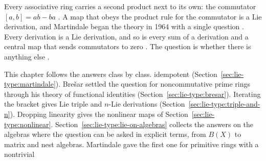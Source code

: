 Every associative ring carries a second product next to its own: the commutator
$[a,b]=ab-ba$ \cite[p.~183]{Martindale1964}. A map that obeys the product rule
for the commutator is a Lie derivation, and Martindale began the theory in 1964
with a single question \cite[p.~183]{Martindale1964}. Every derivation is a Lie derivation, and so is
every sum of a derivation and a central map that sends commutators to zero
\cite[p.~183]{Martindale1964}. The question is whether there is anything else
\cite[p.~183]{Martindale1964}.

This chapter follows the answers class by class.
idempotent (Section~\ref{sec:lie-type:martindale}). Brešar settled the
question for noncommutative prime rings through his theory of functional
identities (Section~\ref{sec:lie-type:bresar}). Iterating the bracket gives
Lie triple and $n$-Lie derivations (Section~\ref{sec:lie-type:triple-and-n}).
Dropping linearity gives the nonlinear maps of
Section~\ref{sec:lie-type:nonlinear}.
Section~\ref{sec:lie-type:lie-on-algebras} collects the answers on the
algebras where the question can be asked in explicit terms, from $B(X)$ to
matrix and nest algebras.
Martindale gave the first one for primitive rings with a nontrivial

